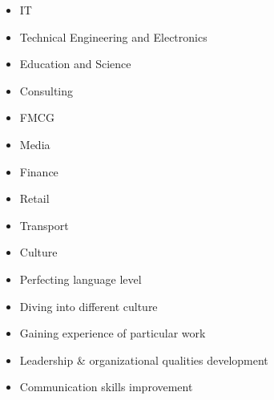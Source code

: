 \begin{itemize}
\item IT
\item Technical Engineering and Electronics
\item Education and Science
\item Consulting
\item FMCG
\item Media
\item Finance
\item Retail
\item Transport
\item Culture

\end{itemize}
\begin{itemize}
\item Perfecting language level
\item Diving into different culture
\item Gaining experience of particular work
\item Leadership \& organizational qualities development
\item Communication skills improvement
\end{itemize}